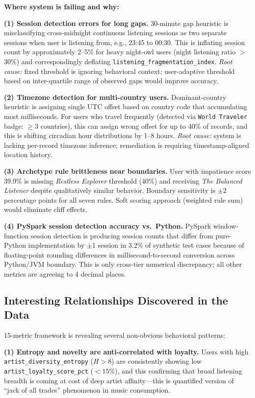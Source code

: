 \documentclass[conference]{IEEEtran}
\begin{document}
\textbf{Where system is failing and why:}

\textbf{(1) Session detection errors for long gaps.}
30-minute gap heuristic is misclassifying cross-midnight continuous listening sessions as two separate sessions when user is listening from, e.g., 23:45 to 00:30. This is inflating session count by approximately 2--5\% for heavy night-owl users (night listening ratio $>$ 30\%) and correspondingly deflating \texttt{listening\_fragmentation\_index}. \textit{Root cause:} fixed threshold is ignoring behavioral context; user-adaptive threshold based on inter-quartile range of observed gaps would improve accuracy.

\textbf{(2) Timezone detection for multi-country users.}
Dominant-country heuristic is assigning single UTC offset based on country code that accumulating most milliseconds. For users who travel frequently (detected via \texttt{World Traveler} badge: $\geq$3 countries), this can assign wrong offset for up to 40\% of records, and this is shifting circadian hour distributions by 1--8 hours. \textit{Root cause:} system is lacking per-record timezone inference; remediation is requiring timestamp-aligned location history.

\textbf{(3) Archetype rule brittleness near boundaries.}
User with impatience score 39.9\% is missing \textit{Restless Explorer} threshold (40\%) and receiving \textit{The Balanced Listener} despite qualitatively similar behavior. Boundary sensitivity is $\pm 2$ percentage points for all seven rules. Soft scoring approach (weighted rule sum) would eliminate cliff effects.

\textbf{(4) PySpark session detection accuracy vs.\ Python.}
PySpark window-function session detection is producing session counts that differ from pure-Python implementation by $\pm$1 session in 3.2\% of synthetic test cases because of floating-point rounding differences in millisecond-to-second conversion across Python/JVM boundary. This is only cross-tier numerical discrepancy; all other metrics are agreeing to 4 decimal places.

\subsection{Interesting Relationships Discovered in the Data}

15-metric framework is revealing several non-obvious behavioral patterns:

\textbf{(1) Entropy and novelty are anti-correlated with loyalty.}
Users with high \texttt{artist\_diversity\_entropy} ($H > 8$) are consistently showing low \texttt{artist\_loyalty\_score\_pct} ($< 15\%$), and this confirming that broad listening breadth is coming at cost of deep artist affinity---this is quantified version of ``jack of all trades'' phenomenon in music consumption.
\end{document}
